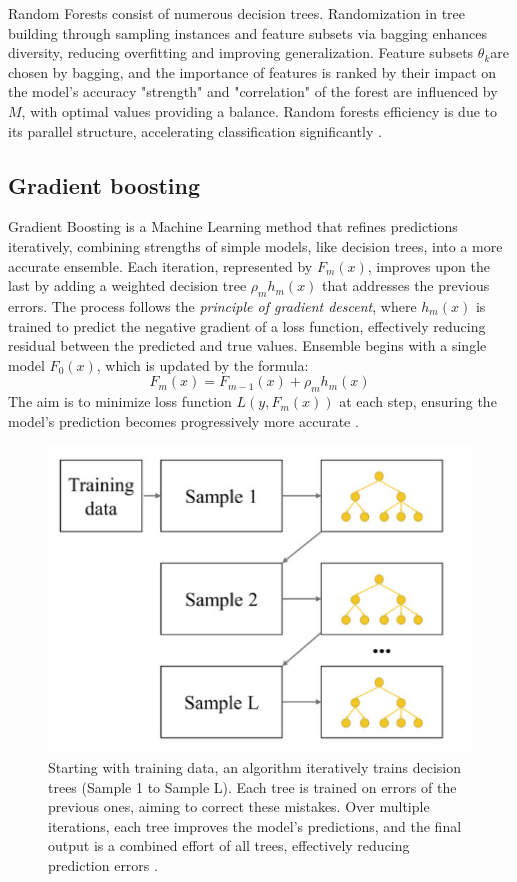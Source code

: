            Random Forests consist of numerous decision trees. Randomization in tree building through sampling instances and feature subsets via bagging enhances diversity, reducing overfitting and improving generalization. Feature subsets $\theta_k$​ are chosen by bagging, and the importance of features is ranked by their impact on the model's accuracy "strength" and "correlation" of the forest are influenced by $M$, with optimal values providing a balance. Random forests efficiency is due to its parallel structure, accelerating classification significantly \cite{parmar_review_2019}.
            
        \subsection{Gradient boosting}
            Gradient Boosting is a Machine Learning method that refines predictions iteratively, combining strengths of simple models, like decision trees, into a more accurate ensemble. Each iteration, represented by $F_m(x)$, improves upon the last by adding a weighted decision tree $\rho_m h_m(x)$ that addresses the previous errors. The process follows the \textit{principle of gradient descent}, where $h_m(x)$ is trained to predict the negative gradient of a loss function, effectively reducing residual between the predicted and true values. Ensemble begins with a single model $F_0(x)$, which is updated by the formula:
            \begin{equation}
                F_m(x) = F_{m-1}(x) + \rho_m h_m(x)
            \end{equation}
            The aim is to minimize loss function $L(y, F_m(x))$ at each step, ensuring the model's prediction becomes progressively more accurate \cite{bentejac_comparative_2021}.
            \begin{figure}[H]
                \centering
                \includegraphics[width=.5\textwidth]{../src/resources/images/models/boosting.png}
                \caption{
                    Starting with training data, an algorithm iteratively trains decision trees (Sample 1 to Sample L). Each tree is trained on errors of the previous ones, aiming to correct these mistakes. Over multiple iterations, each tree improves the model's predictions, and the final output is a combined effort of all trees, effectively reducing prediction errors \cite{cha_comparison_2021}.
                }
                \label{fig:gradient_boosting}
            \end{figure}

